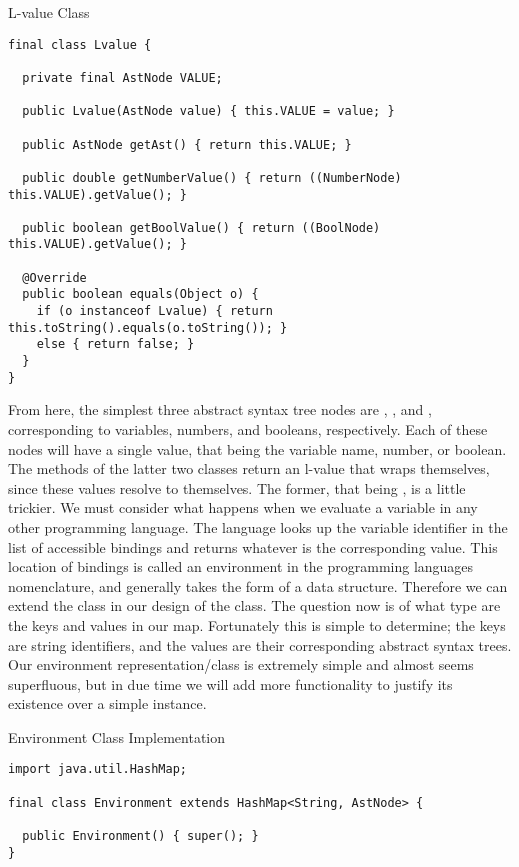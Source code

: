 \begin{cl}{L-value Class}
\begin{lstlisting}[language=MyJava]
final class Lvalue {

  private final AstNode VALUE;

  public Lvalue(AstNode value) { this.VALUE = value; }

  public AstNode getAst() { return this.VALUE; }

  public double getNumberValue() { return ((NumberNode) this.VALUE).getValue(); }

  public boolean getBoolValue() { return ((BoolNode) this.VALUE).getValue(); }

  @Override
  public boolean equals(Object o) {
    if (o instanceof Lvalue) { return this.toString().equals(o.toString()); } 
    else { return false; }
  }
}
\end{lstlisting}
\end{cl}

From here, the simplest three abstract syntax tree nodes are , , and , corresponding to variables, numbers, and booleans, respectively. Each of these nodes will have a single value, that being the variable name, number, or boolean. The  methods of the latter two classes return an l-value that wraps themselves, since these values resolve to themselves. The former, that being , is a little trickier. We must consider what happens when we evaluate a variable in any other programming language. The language looks up the variable identifier in the list of accessible bindings and returns whatever is the corresponding value. This location of bindings is called an environment in the programming languages nomenclature, and generally takes the form of a  data structure. Therefore we can extend the  class in our design of the  class. The question now is of what type are the keys and values in our map. Fortunately this is simple to determine; the keys are string identifiers, and the values are their corresponding abstract syntax trees. Our environment representation/class is extremely simple and almost seems superfluous, but in due time we will add more functionality to justify its existence over a simple  instance.

\begin{cl}{Environment Class Implementation}
\begin{lstlisting}[language=MyJava]
import java.util.HashMap;

final class Environment extends HashMap<String, AstNode> {
  
  public Environment() { super(); }
}
\end{lstlisting}
\end{cl}

